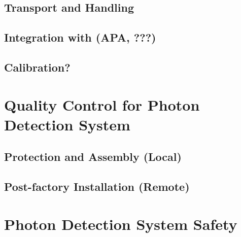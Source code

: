 \subsection{Transport and Handling}
\label{sec:fdsp-pd-install-transport}


\subsection{Integration with (APA, ???)}
\label{sec:fdsp-pd-install-pd-???}


\subsection{Calibration?}
\label{sec:fdsp-pd-install-calib}



\section{Quality Control for Photon Detection System}
\label{sec:fdsp-pd-qc}

\subsection{Protection and Assembly (Local)}
\label{sec:fdsp-pd-qc-local}


\subsection{Post-factory Installation (Remote)}
\label{sec:fdsp-pd-qc-remote}





\section{Photon Detection System Safety}
\label{sec:fdsp-pd-safety}



